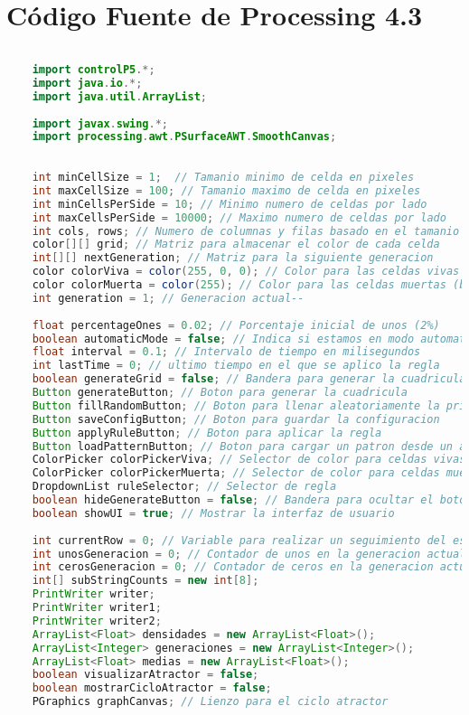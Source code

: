 \documentclass{article}
\begin{document}
	\section{Código Fuente de Processing 4.3}
	\begin{lstlisting}[language=Java, basicstyle=\tiny, breaklines=true, breakatwhitespace=true]
		
	import controlP5.*;
	import java.io.*;
	import java.util.ArrayList;
	
	import javax.swing.*;
	import processing.awt.PSurfaceAWT.SmoothCanvas;
	
	
	int minCellSize = 1;  // Tamanio minimo de celda en pixeles
	int maxCellSize = 100; // Tamanio maximo de celda en pixeles
	int minCellsPerSide = 10; // Minimo numero de celdas por lado
	int maxCellsPerSide = 10000; // Maximo numero de celdas por lado
	int cols, rows; // Numero de columnas y filas basado en el tamanio de la ventana
	color[][] grid; // Matriz para almacenar el color de cada celda
	int[][] nextGeneration; // Matriz para la siguiente generacion
	color colorViva = color(255, 0, 0); // Color para las celdas vivas (rojo)
	color colorMuerta = color(255); // Color para las celdas muertas (blanco)
	int generation = 1; // Generacion actual--
	
	float percentageOnes = 0.02; // Porcentaje inicial de unos (2%)
	boolean automaticMode = false; // Indica si estamos en modo automatico
	float interval = 0.1; // Intervalo de tiempo en milisegundos
	int lastTime = 0; // ultimo tiempo en el que se aplico la regla
	boolean generateGrid = false; // Bandera para generar la cuadricula
	Button generateButton; // Boton para generar la cuadricula
	Button fillRandomButton; // Boton para llenar aleatoriamente la primera linea
	Button saveConfigButton; // Boton para guardar la configuracion
	Button applyRuleButton; // Boton para aplicar la regla
	Button loadPatternButton; // Boton para cargar un patron desde un archivo
	ColorPicker colorPickerViva; // Selector de color para celdas vivas
	ColorPicker colorPickerMuerta; // Selector de color para celdas muertas
	DropdownList ruleSelector; // Selector de regla
	boolean hideGenerateButton = false; // Bandera para ocultar el boton "Generar"
	boolean showUI = true; // Mostrar la interfaz de usuario
	
	int currentRow = 0; // Variable para realizar un seguimiento del estado actual de la fila
	int unosGeneracion = 0; // Contador de unos en la generacion actual
	int cerosGeneracion = 0; // Contador de ceros en la generacion actual
	int[] subStringCounts = new int[8];
	PrintWriter writer;
	PrintWriter writer1;
	PrintWriter writer2;
	ArrayList<Float> densidades = new ArrayList<Float>();
	ArrayList<Integer> generaciones = new ArrayList<Integer>();
	ArrayList<Float> medias = new ArrayList<Float>();
	boolean visualizarAtractor = false;
	boolean mostrarCicloAtractor = false;
	PGraphics graphCanvas; // Lienzo para el ciclo atractor
	

\end{lstlisting}
\end{document}

